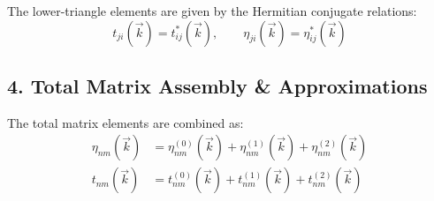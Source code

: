 \documentclass[11pt]{article}
\begin{document}
The lower-triangle elements are given by the Hermitian conjugate relations:
\[
t_{ji}(\vec{k}) = t_{ij}^*(\vec{k}), \qquad \eta_{ji}(\vec{k}) = \eta_{ij}^*(\vec{k})
\]

\subsection*{4. Total Matrix Assembly \& Approximations}

The total matrix elements are combined as:
\begin{align*}
	\eta_{nm}(\vec{k}) &= \eta_{nm}^{(0)}(\vec{k}) + \eta_{nm}^{(1)}(\vec{k}) + \eta_{nm}^{(2)}(\vec{k}) \\
	t_{nm}(\vec{k}) &=  t^{(0)}_{nm}(\vec{k}) + t_{nm}^{(1)}(\vec{k}) + t_{nm}^{(2)}(\vec{k})
\end{align*}
\end{document}
